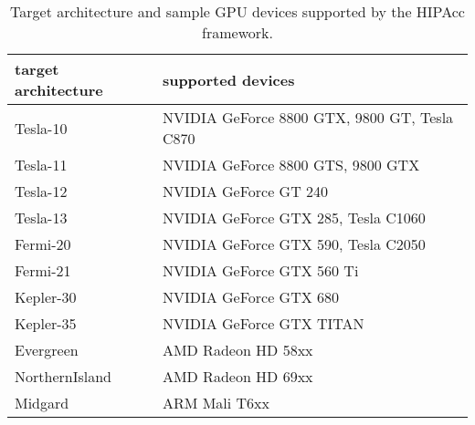 \begin{table}
    \centering
    \begin{tabular}{ll}
\hline
target architecture \qquad& supported devices \\
\hline
Tesla-10                & NVIDIA GeForce 8800 GTX, 9800 GT, Tesla C870 \\
Tesla-11                & NVIDIA GeForce 8800 GTS, 9800 GTX \\
Tesla-12                & NVIDIA GeForce GT 240 \\
Tesla-13                & NVIDIA GeForce GTX 285, Tesla C1060 \\
Fermi-20                & NVIDIA GeForce GTX 590, Tesla C2050 \\
Fermi-21                & NVIDIA GeForce GTX 560 Ti \\
Kepler-30               & NVIDIA GeForce GTX 680 \\
Kepler-35               & NVIDIA GeForce GTX TITAN \\
\hline
Evergreen               & AMD Radeon HD 58xx \\
NorthernIsland          & AMD Radeon HD 69xx \\
\hline
Midgard                 & ARM Mali T6xx \\
\hline
    \end{tabular}
    \caption{Target architecture and sample GPU devices supported by the
    \ac{HIPAcc} framework.}\label{tab:devices}
\end{table}

